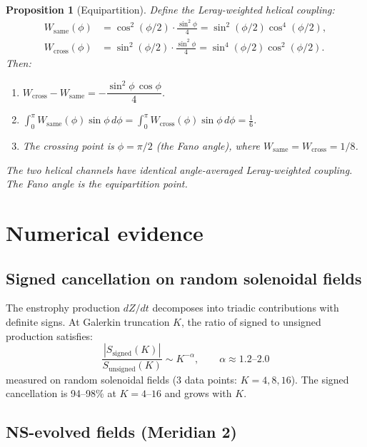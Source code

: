 \documentclass[11pt]{article}
\newtheorem{proposition}[theorem]{Proposition}
\theoremstyle{definition}
\theoremstyle{remark}
\begin{document}
\begin{proposition}[Equipartition]\label{prop:equi}
Define the Leray-weighted helical coupling:
\begin{align*}
  W_{\mathrm{same}}(\phi) &= \cos^2(\phi/2) \cdot \frac{\sin^2\phi}{4}
    = \sin^2(\phi/2)\cos^4(\phi/2), \\
  W_{\mathrm{cross}}(\phi) &= \sin^2(\phi/2) \cdot \frac{\sin^2\phi}{4}
    = \sin^4(\phi/2)\cos^2(\phi/2).
\end{align*}
Then:
\begin{enumerate}
  \item $W_{\mathrm{cross}} - W_{\mathrm{same}}
    = -\dfrac{\sin^2\phi\,\cos\phi}{4}$.
  \item $\displaystyle\int_0^\pi W_{\mathrm{same}}(\phi)\sin\phi\,d\phi
    = \int_0^\pi W_{\mathrm{cross}}(\phi)\sin\phi\,d\phi = \frac{1}{6}$.
  \item The crossing point is $\phi = \pi/2$ (the Fano angle), where
    $W_{\mathrm{same}} = W_{\mathrm{cross}} = 1/8$.
\end{enumerate}
The two helical channels have identical angle-averaged Leray-weighted
coupling. The Fano angle is the equipartition point.
\end{proposition}

\section{Numerical evidence}

\subsection{Signed cancellation on random solenoidal fields}

The enstrophy production $dZ/dt$ decomposes into triadic contributions
with definite signs. At Galerkin truncation $K$, the ratio of signed
to unsigned production satisfies:
\[
  \frac{|S_{\mathrm{signed}}(K)|}{S_{\mathrm{unsigned}}(K)}
  \sim K^{-\alpha}, \qquad \alpha \approx 1.2\text{--}2.0
\]
measured on random solenoidal fields (3 data points: $K = 4, 8, 16$).
The signed cancellation is 94--98\% at $K = 4$--$16$ and grows with $K$.

\subsection{NS-evolved fields (Meridian 2)}
\end{document}
